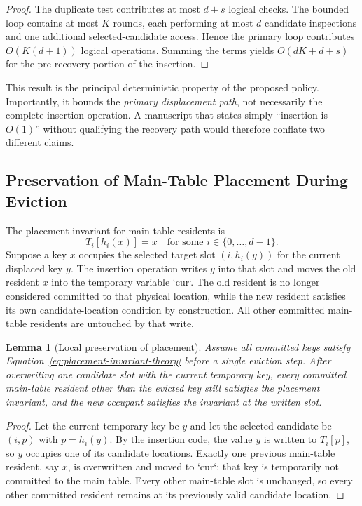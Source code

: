 \documentclass[conference]{IEEEtran}
\newtheorem{lemma}{Lemma}
\begin{document}
\begin{proof}
The duplicate test contributes at most $d+s$ logical checks. The bounded loop contains at most $K$ rounds, each performing at most $d$ candidate inspections and one additional selected-candidate access. Hence the primary loop contributes $O(K(d+1))$ logical operations. Summing the terms yields $O(dK+d+s)$ for the pre-recovery portion of the insertion.
\end{proof}

This result is the principal deterministic property of the proposed policy. Importantly, it bounds the \emph{primary displacement path}, not necessarily the complete insertion operation. A manuscript that states simply ``insertion is $O(1)$'' without qualifying the recovery path would therefore conflate two different claims.

\subsection{Preservation of Main-Table Placement During Eviction}

The placement invariant for main-table residents is
\begin{equation}
    T_i[h_i(x)] = x
    \quad\text{for some }i\in\{0,\ldots,d-1\}.
    \label{eq:placement-invariant-theory}
\end{equation}
Suppose a key $x$ occupies the selected target slot $(i,h_i(y))$ for the current displaced key $y$. The insertion operation writes $y$ into that slot and moves the old resident $x$ into the temporary variable `cur`. The old resident is no longer considered committed to that physical location, while the new resident satisfies its own candidate-location condition by construction. All other committed main-table residents are untouched by that write.

\begin{lemma}[Local preservation of placement]
Assume all committed keys satisfy Equation~\eqref{eq:placement-invariant-theory} before a single eviction step. After overwriting one candidate slot with the current temporary key, every committed main-table resident other than the evicted key still satisfies the placement invariant, and the new occupant satisfies the invariant at the written slot.
\end{lemma}

\begin{proof}
Let the current temporary key be $y$ and let the selected candidate be $(i,p)$ with $p=h_i(y)$. By the insertion code, the value $y$ is written to $T_i[p]$, so $y$ occupies one of its candidate locations. Exactly one previous main-table resident, say $x$, is overwritten and moved to `cur`; that key is temporarily not committed to the main table. Every other main-table slot is unchanged, so every other committed resident remains at its previously valid candidate location.
\end{proof}
\end{document}
